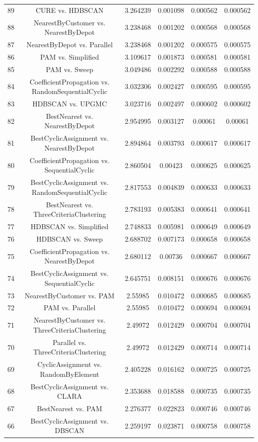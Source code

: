 \documentclass[a4paper,10pt]{article}
\begin{document}
\begin{landscape}
\begin{table}[!htp]
\begin{tabular}{cccccc}
89&CURE vs. HDBSCAN&3.264239&0.001098&0.000562&0.000562\\
88&NearestByCustomer vs. NearestByDepot&3.238468&0.001202&0.000568&0.000568\\
87&NearestByDepot vs. Parallel&3.238468&0.001202&0.000575&0.000575\\
86&PAM vs. Simplified&3.109617&0.001873&0.000581&0.000581\\
85&PAM vs. Sweep&3.049486&0.002292&0.000588&0.000588\\
84&CoefficientPropagation vs. RandomSequentialCyclic&3.032306&0.002427&0.000595&0.000595\\
83&HDBSCAN vs. UPGMC&3.023716&0.002497&0.000602&0.000602\\
82&BestNearest vs. NearestByDepot&2.954995&0.003127&0.00061&0.00061\\
81&BestCyclicAssignment vs. NearestByDepot&2.894864&0.003793&0.000617&0.000617\\
80&CoefficientPropagation vs. SequentialCyclic&2.860504&0.00423&0.000625&0.000625\\
79&BestCyclicAssignment vs. RandomSequentialCyclic&2.817553&0.004839&0.000633&0.000633\\
78&BestNearest vs. ThreeCriteriaClustering&2.783193&0.005383&0.000641&0.000641\\
77&HDBSCAN vs. Simplified&2.748833&0.005981&0.000649&0.000649\\
76&HDBSCAN vs. Sweep&2.688702&0.007173&0.000658&0.000658\\
75&CoefficientPropagation vs. NearestByDepot&2.680112&0.00736&0.000667&0.000667\\
74&BestCyclicAssignment vs. SequentialCyclic&2.645751&0.008151&0.000676&0.000676\\
73&NearestByCustomer vs. PAM&2.55985&0.010472&0.000685&0.000685\\
72&PAM vs. Parallel&2.55985&0.010472&0.000694&0.000694\\
71&NearestByCustomer vs. ThreeCriteriaClustering&2.49972&0.012429&0.000704&0.000704\\
70&Parallel vs. ThreeCriteriaClustering&2.49972&0.012429&0.000714&0.000714\\
69&CyclicAssignment vs. RandomByElement&2.405228&0.016162&0.000725&0.000725\\
68&BestCyclicAssignment vs. CLARA&2.353688&0.018588&0.000735&0.000735\\
67&BestNearest vs. PAM&2.276377&0.022823&0.000746&0.000746\\
66&BestCyclicAssignment vs. DBSCAN&2.259197&0.023871&0.000758&0.000758\\

\end{tabular}
\end{table}
\end{landscape}
\end{document}

